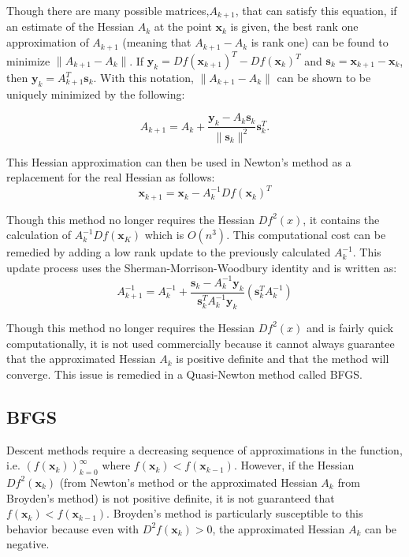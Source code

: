 Though there are many possible matrices,$A_{k+1}$, that can satisfy this equation, if an estimate of the Hessian $A_k$ at the point $\mathbf{x}_k$ is given, the best rank one approximation of $A_{k+1}$ (meaning that $A_{k+1} -  A_{k}$ is rank one) can be found to minimize $\|A_{k+1}-A_k\|$.
If $\mathbf{y}_k = Df(\mathbf{x}_{k+1})^T-Df(\mathbf{x}_k)^T$ and $\mathbf{s}_k=\mathbf{x}_{k+1}-\mathbf{x}_k$,  then $\mathbf{y}_k = A_{k+1}^T\mathbf{s}_k$.
With this notation, $\|A_{k+1}-A_k\|$ can be shown to be uniquely minimized by the following:

\begin{equation} \label{Eq:BroydenHessian}
A_{k+1} = A_k + \frac{\mathbf{y}_k-A_k\mathbf{s}_k}{\|\mathbf{s}_k\|^2}\mathbf{s}_k^T.
\end{equation}

This Hessian approximation can then be used in Newton's method as a replacement for the real Hessian as follows:
\begin{equation} \label{Eq:BroydenSolve}
\mathbf{x}_{k+1} = \mathbf{x}_k-A_{k}^{-1}Df(\mathbf{x}_k)^T
\end{equation}

Though this method no longer requires the Hessian $Df^2(x)$, it contains the calculation of $A_k^{-1}Df(\mathbf{x}_K)$ which is $O(n^3)$.
This computational cost can be remedied by adding a low rank update to the previously calculated $A_k^{-1}$.
This update process uses the Sherman-Morrison-Woodbury identity and is written as:
\[
A_{k+1}^{-1} = A_{k}^{-1} + \frac{\mathbf{s}_k - A_{k}^{-1}\mathbf{y}_k}{\mathbf{s}_k^T A_{k}^{-1}\mathbf{y}_k} (\mathbf{s}_k^T A_{k}^{-1})
\]

Though this method no longer requires the Hessian $Df^2(x)$ and is fairly quick computationally, it is not used commercially because it cannot always guarantee that the approximated Hessian $A_k$ is positive definite and that the method will converge.
This issue is remedied in a Quasi-Newton method called BFGS.

\subsection*{BFGS}
Descent methods require a decreasing sequence of approximations in the function, i.e. $(f(\mathbf{x}_k))_{k=0}^{\infty}$ where  $f(\mathbf{x}_{k})<f(\mathbf{x}_{k-1})$.
However, if the Hessian $Df^2(\mathbf{x}_k)$ (from Newton's method or the approximated Hessian $A_k$ from Broyden's method) is not positive definite, it is not guaranteed that $f(\mathbf{x}_{k})<f(\mathbf{x}_{k-1})$.
Broyden's method is particularly susceptible to this behavior because even with $D^2f(\mathbf{x}_k)>0$, the approximated Hessian $A_k$ can be negative.

